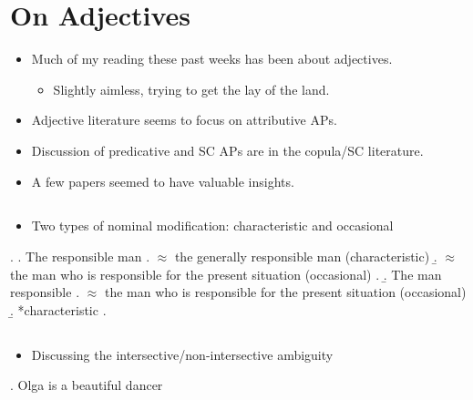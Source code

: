 \documentclass[letterpaper]{article}
\begin{document}
\section{On Adjectives}
\begin{itemize}
  \item Much of my reading these past weeks has been about adjectives.
    \begin{itemize}
      \item Slightly aimless, trying to get the lay of the land.
    \end{itemize}
  \item Adjective literature seems to focus on attributive APs.
  \item Discussion of predicative and SC APs are in the copula/SC literature.
  \item A few papers seemed to have valuable insights.
\end{itemize}
\subsection{\textcite{bolinger1967adjectives}}
\begin{itemize}
  \item Two types of nominal modification: characteristic and occasional
\end{itemize}
\ex.
\a. The responsible man 
\a. $\approx$ the generally responsible man (characteristic)
\b. $\approx$ the man who is responsible for the present situation (occasional)
\z.
\b. The man responsible
\a. $\approx$ the man who is responsible for the present situation (occasional)
\b. *characteristic
\z.

\subsection{\textcite{larson1998events}}
\begin{itemize}
  \item Discussing the intersective/non-intersective ambiguity
\end{itemize}
\ex. Olga is a beautiful dancer
\end{document}
